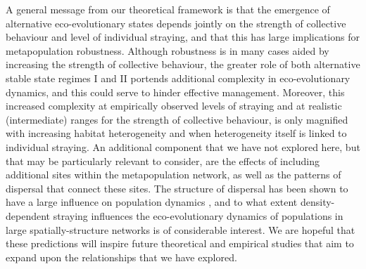 \documentclass{revtex4}
\begin{document}
A general message from our theoretical framework is that the emergence of alternative eco-evolutionary states depends jointly on the strength of collective behaviour and level of individual straying, and that this has large implications for metapopulation robustness.
Although robustness is in many cases aided by increasing the strength of collective behaviour, the greater role of both alternative stable state regimes I and II portends additional complexity in eco-evolutionary dynamics, and this could serve to hinder effective management.
Moreover, this increased complexity at empirically observed levels of straying \citep{H:2013fs} and at realistic (intermediate) ranges for the strength of collective behaviour, is only magnified with increasing habitat heterogeneity and when heterogeneity itself is linked to individual straying.
An additional component that we have not explored here, but that may be particularly relevant to consider, are the effects of including additional sites within the metapopulation network, as well as the patterns of dispersal that connect these sites.
The structure of dispersal has been shown to have a large influence on population dynamics \citep{Heino:1997vf,Carrara:2014cy,Yeakel:2013vz,Gilarranz:2017fs}, and to what extent density-dependent straying influences the eco-evolutionary dynamics of populations in large spatially-structure networks is of considerable interest.
We are hopeful that these predictions will inspire future theoretical and empirical studies that aim to expand upon the relationships that we have explored.
\end{document}
